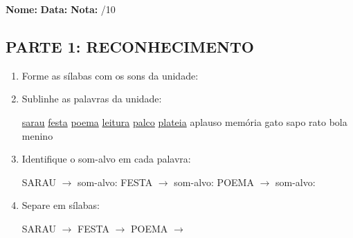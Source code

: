 \begin{exercicio}

\noindent\textbf{Nome:} \underline{\hspace{3.2cm}} \quad \textbf{Data:} \underline{\hspace{1.6cm}} \quad \textbf{Nota:} \underline{\hspace{0.9cm}}/10


\subsection*{PARTE 1: RECONHECIMENTO}

\begin{enumerate}

  \item Forme as sílabas com os sons da unidade:

\begin{center}
\end{center}

  \item Sublinhe as palavras da unidade:

\begin{center}
  \uline{sarau} \quad \uline{festa} \quad \uline{poema} \quad \uline{leitura} \quad \uline{palco} \quad \uline{plateia} \quad aplauso \quad memória \quad gato \quad sapo \quad rato \quad bola \quad menino
\end{center}

  \item Identifique o som-alvo em cada palavra:
  \begin{center}
  SARAU $\rightarrow$ som-alvo: \underline{\hspace{1cm}} \quad FESTA $\rightarrow$ som-alvo: \underline{\hspace{1cm}} \quad POEMA $\rightarrow$ som-alvo: \underline{\hspace{1cm}}
  \end{center}

  \item Separe em sílabas:
  \begin{center}
  SARAU $\rightarrow$ \underline{\hspace{1cm}} \quad FESTA $\rightarrow$ \underline{\hspace{1cm}} \quad POEMA $\rightarrow$ \underline{\hspace{1cm}}
  \end{center}


\end{enumerate}
\end{exercicio}

